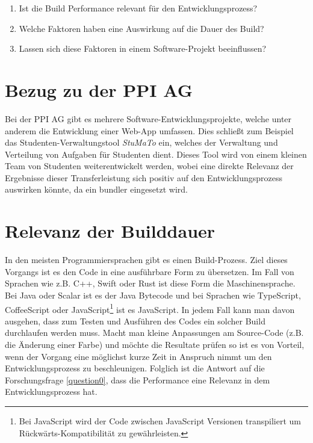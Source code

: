 \documentclass[11pt]{report}
\begin{document}
	    	\begin{enumerate}
		    	\item Ist die Build Performance relevant für den Entwicklungsprozess? \label{question0}
		    	\item Welche Faktoren haben eine Auswirkung auf die Dauer des Build? \label{question1}
		    	\item Lassen sich diese Faktoren in einem Software-Projekt beeinflussen? \label{question2}
		    \end{enumerate}
		    
	    \pagebreak

		\section{Bezug zu der PPI AG}
			Bei der PPI AG gibt es mehrere Software-Entwicklungsprojekte, welche unter anderem die Entwicklung einer Web-App umfassen. Dies schließt zum Beispiel das Studenten-Verwaltungstool \emph{StuMaTo} ein, welches der Verwaltung und Verteilung von Aufgaben für Studenten dient. Dieses Tool wird von einem kleinen Team von Studenten weiterentwickelt werden, wobei eine direkte Relevanz der Ergebnisse dieser Transferleistung sich positiv auf den Entwicklungsprozess auswirken könnte, da ein \Gls{bundler} eingesetzt wird.
	
		\section{Relevanz der Builddauer}
			In den meisten Programmiersprachen gibt es einen Build-Prozess. Ziel dieses Vorgangs ist es den Code in eine ausführbare Form zu übersetzen. Im Fall von Sprachen wie z.B. C++, Swift oder Rust ist diese Form die Maschinensprache. Bei Java oder Scalar ist es der Java Bytecode und bei Sprachen wie TypeScript, CoffeeScript oder JavaScript\footnote{Bei JavaScript wird der Code zwischen JavaScript Versionen transpiliert um Rückwärts-Kompatibilität zu gewährleisten.} ist es JavaScript. In jedem Fall kann man davon ausgehen, dass zum Testen und Ausführen des Codes ein solcher Build durchlaufen werden muss. Macht man kleine Anpassungen am Source-Code (z.B. die Änderung einer Farbe) und möchte die Resultate prüfen so ist es von Vorteil, wenn der Vorgang eine möglichst kurze Zeit in Anspruch nimmt um den Entwicklungsprozess zu beschleunigen. Folglich ist die Antwort auf die Forschungsfrage \ref{question0}, dass die Performance eine Relevanz in dem Entwicklungsprozess hat.
\end{document}
